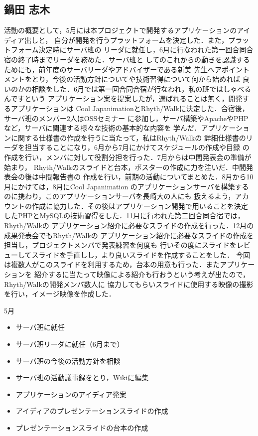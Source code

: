 \subsection{鍋田 志木}
\par
活動の概要として，5月には本プロジェクトで開発するアプリケーションのアイディア出しと，
自分が開発を行うプラットフォームを決定した．また，プラットフォーム決定時にサーバ班の
リーダに就任し，6月に行なわれた第一回合同合宿の終了時までリーダを務めた．サーバ班と
してのこれからの動きを認識するためにも，前年度のサーバリーダやアドバイザーである新美
先生へアポイントメントをとり，今後の活動方針についてや技術習得について何から始めれば
良いのかの相談をした．6月では第一回合同合宿が行なわれ，私の班ではしゃべるんですという
アプリケーション案を提案したが，選ばれることは無く，開発するアプリケーションは
Cool JapanimationとRhyth/Walkに決定した．合宿後，サーバ班のメンバー2人はOSSセミナー
に参加し，サーバ構築やApacheやPHPなど，サーバに関連する様々な技術の基本的な内容を
学んだ．アプリケーションに関する仕様書の作成を行うに当たって，私はRhyth/Walkの
詳細仕様書のリーダを担当することになり，6月から7月にかけてスケジュールの作成や目録
の作成を行い，メンバに対して役割分担を行った．7月からは中間発表会の準備が始まり，
Rhyth/Walkのスライドと台本，ポスターの作成に力を注いだ．中間発表会の後は中間報告書の
作成を行い，前期の活動についてまとめた．8月から10月にかけては，8月にCool Japanimation
のアプリケーションサーバを構築するのに携わり，このアプリケーションサーバを長崎大の人にも
扱えるよう，アカウントの作成に協力した．その後はアプリケーション開発で用いることを決定
したPHPとMySQLの技術習得をした．11月に行われた第二回合同合宿では，Rhyth/Walkの
アプリケーション紹介に必要なスライドの作成を行った．12月の成果発表会でもRhyth/Walkの
アプリケーション紹介に必要なスライドの作成を担当し，プロジェクトメンバで発表練習を何度も
行いその度にスライドをレビューしてスライドを手直しし，より良いスライドを作成することをした．
今回は複数人がこのスライドを利用するため，台本の用意も行った．またアプリケーションを
紹介するに当たって映像による紹介も行おうという考えが出たので，Rhyth/Walkの開発メンバ数人に
協力してもらいスライドに使用する映像の撮影を行い，イメージ映像を作成した．
\par
5月
\begin{itemize}
\item サーバ班に就任
\item サーバ班リーダに就任（6月まで）
\item サーバ班の今後の活動方針を相談
\item サーバ班の活動議事録をとり，Wikiに編集
\item アプリケーションのアイディア発案
\item アイディアのプレゼンテーションスライドの作成
\item プレゼンテーションスライドの台本の作成
\end{itemize}
